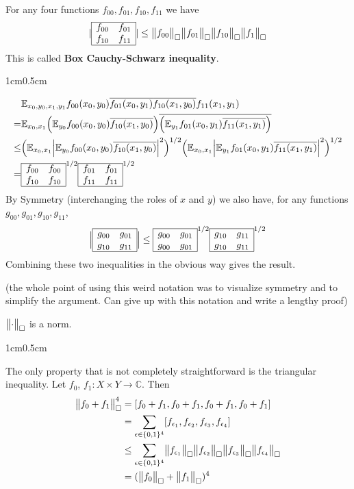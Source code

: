 \documentclass[10pt,a4paper]{report}
\newenvironment{proof}
{\begin{changemargin}{1cm}{0.5cm}
	}%
	{\end{changemargin}
}
\begin{document}
 For any four functions $f_{00}, f_{01}, f_{10}, f_{11}$ we have
\begin{align*}
|\boxinn{f_{00}}{f_{01}}{f_{10}}{f_{11}}| \leq \boxnorm{f_{00}} \boxnorm{f_{01}}\boxnorm{f_{10}}\boxnorm{f_{1}}
\end{align*}
This is called \textbf{Box Cauchy-Schwarz inequality}.
\begin{proof}
\pf \begin{align*}
& \avg_{x_0,y_0,x_1,y_1} f_{00}(x_0,y_0) \bar{f_{01}(x_0,y_1)} \bar{f_{10}(x_1,y_0)} f_{11}(x_1,y_1) \\
=& \avg_{x_0,x_1} \Big( \avg_{y_0} f_{00}(x_0,y_0)   \bar{f_{10}(x_1,y_0)} \Big) \overline{\Big( \avg_{y_1} f_{01}(x_0,y_1) \bar{f_{11}(x_1,y_1)} \Big)} \\
\leq&  \Big( \avg_{x_0,x_1} \Big| \avg_{y_0} f_{00}(x_0,y_0) \bar{f_{10}(x_1,y_0)} \Big|^2 \Big)^{1/2} \Big( \avg_{x_0,x_1} \Big| \avg_{y_1} f_{01}(x_0,y_1) \bar{f_{11}(x_1,y_1)} \Big|^2 \Big)^{1/2} \\
=& \boxinn{f_{00}}{f_{00}}{f_{10}}{f_{10}}^{1/2} \boxinn{f_{01}}{f_{01}}{f_{11}}{f_{11}}^{1/2}
\end{align*}
By Symmetry (interchanging the roles of $x$ and $y$) we also have, for any functions $g_{00}, g_{01}, g_{10}, g_{11}$, 
\begin{align*}
\Big| \boxinn{g_{00}}{g_{01}}{g_{10}}{g_{11}} \Big| \leq \boxinn{g_{00}}{g_{01}}{g_{00}}{g_{01}}^{1/2} \boxinn{g_{10}}{g_{11}}{g_{10}}{g_{11}}^{1/2}
\end{align*}
Combining these two inequalities in the obvious way gives the result.

\eop
\end{proof}
(the whole point of using this weird notation was to visualize symmetry and to simplify the argument. Can give up with this notation and write a lengthy proof)
\s

 $\bigl\lVert\cdot\bigr\rVert_{\tiny{\square}}$ is a norm.
\begin{proof}
\pf The only property that is not completely straightforward is the triangular inequality. Let $f_0$, $f_1: X\times Y \rightarrow \mathbb{C}$. Then
\begin{align*}
\bigl\lVert f_0 + f_1\bigr\rVert_{\tiny{\square}}^4 &=  [f_0+f_1 ,f_0+f_1,f_0+f_1,f_0+f_1] \\
&= \sum_{\epsilon \in \{0,1\}^4} [f_{\epsilon_1},f_{\epsilon_2},f_{\epsilon_3},f_{\epsilon_4}] \\
&\leq \sum_{\epsilon \in \{0,1\}^4} \bigl\lVert f_{\epsilon_1}\bigr\rVert_{\tiny{\square}} \bigl\lVert f_{\epsilon_2}\bigr\rVert_{\tiny{\square}} \bigl\lVert f_{\epsilon_3}\bigr\rVert_{\tiny{\square}} \bigl\lVert f_{\epsilon_4}\bigr\rVert_{\tiny{\square}} \\
&= (\bigl\lVert f_0\bigr\rVert_{\tiny{\square}} + \bigl\lVert f_1\bigr\rVert_{\tiny{\square}})^4
\end{align*}

\eop
\end{proof}
\s
\end{document}
